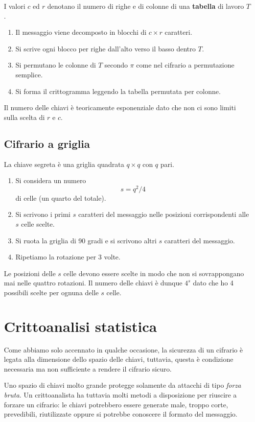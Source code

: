 I valori $c$ ed $r$ denotano il numero di righe e di colonne di una \textbf{tabella} di lavoro $T$.
\begin{enumerate}
	\item Il messaggio viene decomposto in blocchi di $c \times r$ caratteri.
	\item Si scrive ogni blocco per righe dall'alto verso il basso dentro $T$.
	\item Si permutano le colonne di $T$ secondo $\pi$ come nel cifrario a permutazione semplice.
	\item Si forma il crittogramma leggendo la tabella permutata per colonne.
\end{enumerate}
Il numero delle chiavi \`e teoricamente esponenziale dato che non ci sono limiti sulla scelta di $r$ e $c$.

\subsection{Cifrario a griglia}
La chiave segreta \`e una griglia quadrata $q \times q$ con $q$ pari.
\begin{enumerate}
	\item Si considera un numero
	      \[ s = q^2 / 4 \]
	      di celle (un quarto del totale).
	\item Si scrivono i primi $s$ caratteri del messaggio nelle posizioni corrispondenti alle $s$ celle scelte.
	\item Si ruota la griglia di 90 gradi e si scrivono altri $s$ caratteri del messaggio.
	\item Ripetiamo la rotazione per 3 volte.
\end{enumerate}
Le posizioni delle $s$ celle devono essere scelte in modo che non si sovrappongano mai nelle quattro rotazioni. Il numero
delle chiavi \`e dunque $4^s$ dato che ho 4 possibili scelte per ognuna delle $s$ celle.

\section{Crittoanalisi statistica}\label{crittoanalisi_statistica}
Come abbiamo solo accennato in qualche occasione, la sicurezza di un cifrario \`e legata alla dimensione dello spazio
delle chiavi, tuttavia, questa \`e condizione necessaria ma non sufficiente a rendere il cifrario sicuro.

Uno spazio di chiavi molto grande protegge solamente da attacchi di tipo \emph{forza bruta}. Un crittoanalista ha
tuttavia molti metodi a disposizione per riuscire a forzare un cifrario: le chiavi potrebbero essere generate male,
troppo corte, prevedibili, riutilizzate oppure si potrebbe conoscere il formato del messaggio.

